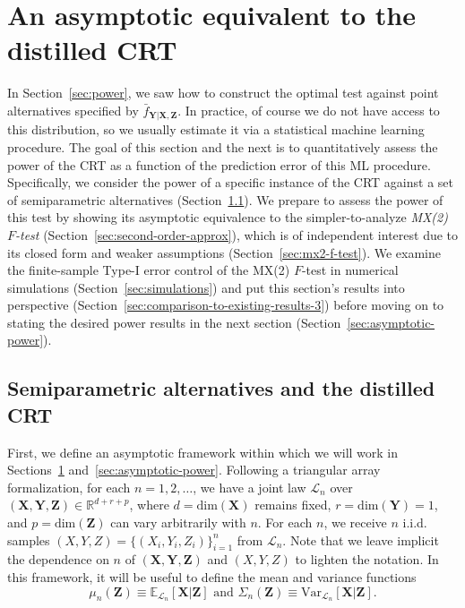 \documentclass[12pt]{article}
\theoremstyle{definition}
\theoremstyle{remark}
\newcommand{\prx}{\bm X}
\newcommand{\srx}{X}
\newcommand{\prz}{\bm Z}
\newcommand{\srz}{Z}
\newcommand{\pry}{{\bm Y}}
\newcommand{\sry}{Y}
\begin{document}
\section{An asymptotic equivalent to the distilled CRT} \label{sec:weakening}

In Section~\ref{sec:power}, we saw how to construct the optimal test against point alternatives specified by $\bar f_{\pry|\prx,\prz}$. In practice, of course we do not have access to this distribution, so we usually estimate it via a statistical machine learning procedure. The goal of this section and the next is to quantitatively assess the power of the CRT as a function of the prediction error of this ML procedure. Specifically, we consider  the power of a specific instance of the CRT against a set of semiparametric alternatives (Section~\ref{sec:asymptotic-setup}). We prepare to assess the power of this test by showing its asymptotic equivalence to the simpler-to-analyze \textit{MX(2) $F$-test} (Section~\ref{sec:second-order-approx}), which is of independent interest due to its closed form and weaker assumptions (Section~\ref{sec:mx2-f-test}). We examine the finite-sample Type-I error control of the MX(2) $F$-test in numerical simulations (Section~\ref{sec:simulations}) and put this section's results into perspective (Section~\ref{sec:comparison-to-existing-results-3}) before moving on to stating the desired power results in the next section (Section~\ref{sec:asymptotic-power}).


\subsection{Semiparametric alternatives and the distilled CRT} \label{sec:asymptotic-setup}

First, we define an asymptotic framework within which we will work in Sections~\ref{sec:weakening} and~\ref{sec:asymptotic-power}. Following a triangular array formalization, for each $n = 1, 2, \dots$, we have a joint law $\mathcal L_n$ over $(\prx, \pry, \prz) \in \mathbb R^{d + r + p}$, where $d = \text{dim}(\prx)$ remains fixed, $r = \text{dim}(\pry) = 1$, and $p = \text{dim}(\prz)$ can vary arbitrarily with $n$. For each $n$, we receive $n$ i.i.d. samples $(\srx, \sry, \srz) = \{(\srx_i, \sry_i, \srz_i)\}_{i = 1}^n$ from $\mathcal L_n$. Note that we leave implicit the dependence on $n$ of $(\prx,\pry,\prz)$ and $(X,Y,Z)$ to lighten the notation. In this framework, it will be useful to define the mean and variance functions
\begin{equation}
	\mu_n(\prz) \equiv \mathbb E_{\mathcal L_n}[\prx|\prz]  \text{ and } \Sigma_n(\prz) \equiv \text{Var}_{\mathcal L_n}[\prx|\prz].
	\label{eq:conditional-mean-variance}
\end{equation}
\end{document}
